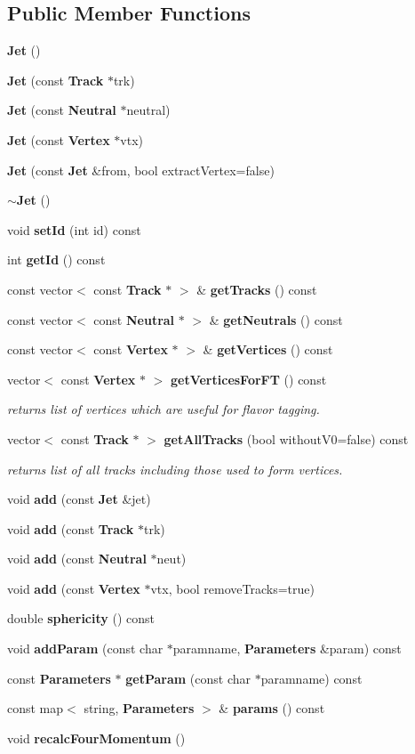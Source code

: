 \subsection*{Public Member Functions}
\begin{DoxyCompactItemize}
\item 
\textbf{ Jet} ()
\item 
\textbf{ Jet} (const \textbf{ Track} $\ast$trk)
\item 
\textbf{ Jet} (const \textbf{ Neutral} $\ast$neutral)
\item 
\textbf{ Jet} (const \textbf{ Vertex} $\ast$vtx)
\item 
\textbf{ Jet} (const \textbf{ Jet} \&from, bool extract\+Vertex=false)
\item 
\textbf{ $\sim$\+Jet} ()
\item 
void \textbf{ set\+Id} (int id) const
\item 
int \textbf{ get\+Id} () const
\item 
const vector$<$ const \textbf{ Track} $\ast$ $>$ \& \textbf{ get\+Tracks} () const
\item 
const vector$<$ const \textbf{ Neutral} $\ast$ $>$ \& \textbf{ get\+Neutrals} () const
\item 
const vector$<$ const \textbf{ Vertex} $\ast$ $>$ \& \textbf{ get\+Vertices} () const
\item 
vector$<$ const \textbf{ Vertex} $\ast$ $>$ \textbf{ get\+Vertices\+For\+FT} () const
\begin{DoxyCompactList}\small\item\em returns list of vertices which are useful for flavor tagging. \end{DoxyCompactList}\item 
vector$<$ const \textbf{ Track} $\ast$ $>$ \textbf{ get\+All\+Tracks} (bool without\+V0=false) const
\begin{DoxyCompactList}\small\item\em returns list of all tracks including those used to form vertices. \end{DoxyCompactList}\item 
void \textbf{ add} (const \textbf{ Jet} \&jet)
\item 
void \textbf{ add} (const \textbf{ Track} $\ast$trk)
\item 
void \textbf{ add} (const \textbf{ Neutral} $\ast$neut)
\item 
void \textbf{ add} (const \textbf{ Vertex} $\ast$vtx, bool remove\+Tracks=true)
\item 
double \textbf{ sphericity} () const
\item 
void \textbf{ add\+Param} (const char $\ast$paramname, \textbf{ Parameters} \&param) const
\item 
const \textbf{ Parameters} $\ast$ \textbf{ get\+Param} (const char $\ast$paramname) const
\item 
const map$<$ string, \textbf{ Parameters} $>$ \& \textbf{ params} () const
\item 
void \textbf{ recalc\+Four\+Momentum} ()
\end{DoxyCompactItemize}
